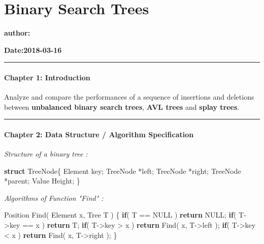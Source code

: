 \documentclass[]{article}
\date{}
\newenvironment{Shaded}{}{}
\newcommand{\KeywordTok}[1]{\textcolor[rgb]{0.00,0.44,0.13}{\textbf{#1}}}
\newcommand{\ControlFlowTok}[1]{\textcolor[rgb]{0.00,0.44,0.13}{\textbf{#1}}}
\newcommand{\NormalTok}[1]{#1}
\let\oldparagraph\paragraph
\renewcommand{\paragraph}[1]{\oldparagraph{#1}\mbox{}}
\begin{document}
\section{Binary Search Trees}\label{header-n0}

\textbf{author:}

\textbf{Date:2018-03-16}

\begin{center}\rule{0.5\linewidth}{\linethickness}\end{center}

\paragraph{Chapter 1: Introduction}\label{header-n7}

 Analyze and compare the performances of a sequence of insertions and
deletions between \textbf{unbalanced binary search trees}, \textbf{AVL
trees} and \textbf{splay trees}.

\begin{center}\rule{0.5\linewidth}{\linethickness}\end{center}

\paragraph{Chapter 2: Data Structure / Algorithm
Specification}\label{header-n11}

\emph{Structure of a binary tree :}

\begin{Shaded}
\begin{Highlighting}[]
\KeywordTok{struct}\NormalTok{ TreeNode\{}
\NormalTok{    Element key;}
\NormalTok{    TreeNode *left;}
\NormalTok{    TreeNode *right;}
\NormalTok{    TreeNode *parent;}
\NormalTok{    Value Height;}
\NormalTok{\}}
\end{Highlighting}
\end{Shaded}

\emph{Algorithms of Function "Find" :}

\begin{Shaded}
\begin{Highlighting}[]
\NormalTok{Position Find( Element x, Tree T )}
\NormalTok{\{}
    \ControlFlowTok{if}\NormalTok{( T == NULL ) }\ControlFlowTok{return}\NormalTok{ NULL;}
    \ControlFlowTok{if}\NormalTok{( T->key == x ) }\ControlFlowTok{return}\NormalTok{ T;}
    \ControlFlowTok{if}\NormalTok{( T->key > x ) }\ControlFlowTok{return}\NormalTok{ Find( x, T->left );}
    \ControlFlowTok{if}\NormalTok{( T->key < x ) }\ControlFlowTok{return}\NormalTok{ Find( x, T->right );}
\NormalTok{\}}
\end{Highlighting}
\end{Shaded}
\end{document}
